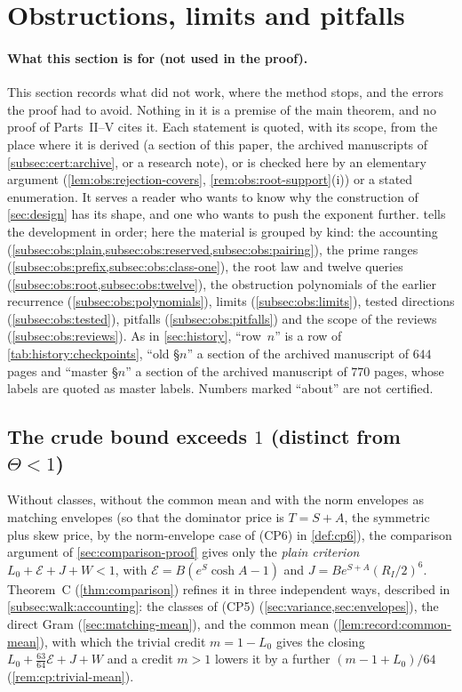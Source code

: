 \section{Obstructions, limits and pitfalls}\label{sec:obstructions}

\paragraph{What this section is for (not used in the proof).}
This section records what did not work, where the method stops, and the errors
the proof had to avoid. Nothing in it is a premise of the main theorem, and no
proof of Parts~II--V cites it. Each statement is quoted, with its scope, from
the place where it is derived (a section of this paper, the archived manuscripts
of \cref{subsec:cert:archive}, or a research note), or is checked here by an
elementary argument (\cref{lem:obs:rejection-covers}, \cref{rem:obs:root-support}(i))
or a stated enumeration.
It serves a reader
who wants to know why the construction of \cref{sec:design} has its shape, and
one who wants to push the exponent further.  tells the
development in order; here the material is grouped by kind: the accounting
(\cref{subsec:obs:plain,subsec:obs:reserved,subsec:obs:pairing}), the prime
ranges (\cref{subsec:obs:prefix,subsec:obs:class-one}), the root law and twelve
queries (\cref{subsec:obs:root,subsec:obs:twelve}), the obstruction
polynomials of the earlier recurrence (\cref{subsec:obs:polynomials}), limits
(\cref{subsec:obs:limits}), tested directions (\cref{subsec:obs:tested}),
pitfalls (\cref{subsec:obs:pitfalls}) and the scope of the reviews
(\cref{subsec:obs:reviews}). As in \cref{sec:history}, ``row~$n$'' is a row of
\cref{tab:history:checkpoints}, ``old \S$n$'' a section of the archived
manuscript of $644$ pages and ``master \S$n$'' a section of the archived
manuscript of $770$ pages, whose labels are quoted as master labels. Numbers
marked ``about'' are not certified.

\subsection{The crude bound exceeds \texorpdfstring{$1$}{1} (distinct from \texorpdfstring{$\Theta<1$}{Theta<1})}\label{subsec:obs:plain}

Without classes, without the common mean and with the norm envelopes as
matching envelopes (so that the dominator price is
$T=S+A$, the symmetric plus skew price, by the norm-envelope
case of (CP6) in \cref{def:cp6}), the comparison argument of
\cref{sec:comparison-proof} gives only the \emph{plain criterion}
$L_0+\mathcal E+J+W<1$, with $\mathcal E=B(e^S\cosh A-1)$ and
$J=Be^{S+A}(R_I/2)^6$. Theorem~C (\cref{thm:comparison}) refines it in three
independent ways, described in \cref{subsec:walk:accounting}: the classes of
(CP5) (\cref{sec:variance,sec:envelopes}), the direct Gram
(\cref{sec:matching-mean}), and the common mean (\cref{lem:record:common-mean}),
with which the trivial credit $m=1-L_0$ gives the closing
$L_0+\frac{63}{64}\mathcal E+J+W$ and a credit $m>1$ lowers it by a further
$(m-1+L_0)/64$ (\cref{rem:cp:trivial-mean}).

